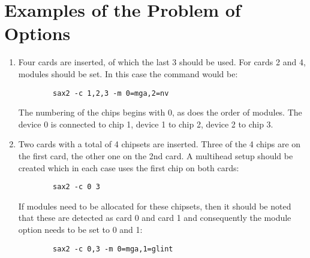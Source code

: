 \chapter{Examples of the Problem of Options}
\minitoc

\begin{enumerate}
\item Four cards are inserted, of which the last 3 should be used. For cards 2
  and 4, modules should be set. In this case the command would be:
      \begin{verbatim}
        sax2 -c 1,2,3 -m 0=mga,2=nv
      \end{verbatim}
      The numbering of the chips begins with 0, as does the order of
      modules. The device 0 is connected to chip 1, device 1 to chip 2, device
      2 to chip 3. 

\item Two cards with a total of 4 chipsets are inserted.
      Three of the 4 chips are on the first card, the other one on the 2nd
      card. A multihead setup should be created which in each case uses the
      first chip on both cards:
      \begin{verbatim}
        sax2 -c 0 3 
      \end{verbatim}
      If modules need to be allocated for these chipsets, then it should be
      noted that these are detected as card 0 and card 1 and consequently the
      module option needs to be set to 0 and 1: 
      \begin{verbatim}
        sax2 -c 0,3 -m 0=mga,1=glint
      \end{verbatim}
\end{enumerate}
